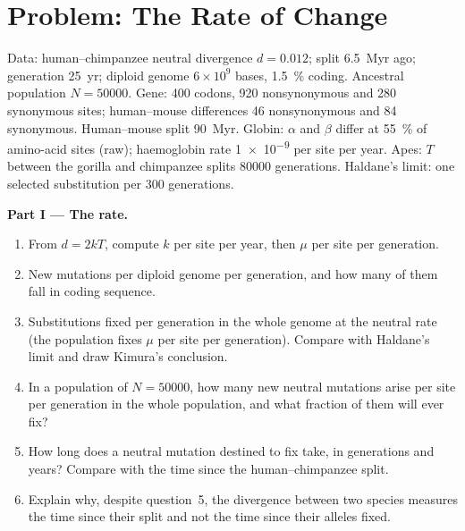 \section{Problem: The Rate of Change}

\begin{problem}
\label{pb:b3:molecular-evolution:1}
Data: human--chimpanzee neutral divergence $d = 0.012$; split
\qty{6.5}{Myr} ago; generation \qty{25}{yr}; diploid genome $6\times
10^{9}$ bases, \qty{1.5}{\%} coding. Ancestral population $N =
\num{50000}$. Gene: 400 codons, 920 nonsynonymous and 280 synonymous
sites; human--mouse differences 46 nonsynonymous and 84 synonymous.
Human--mouse split \qty{90}{Myr}. Globin: $\alpha$ and $\beta$ differ at
\qty{55}{\%} of amino-acid sites (raw); haemoglobin rate \num{1e-9} per
site per year. Apes: $T$ between the gorilla and chimpanzee splits
\num{80000} generations. Haldane's limit: one selected substitution per
300 generations.

\medskip
\noindent\textbf{Part I --- The rate.}
\begin{enumerate}
  \item From $d = 2kT$, compute $k$ per site per year, then $\mu$ per
        site per generation.
  \item New mutations per diploid genome per generation, and how many of
        them fall in coding sequence.
  \item Substitutions fixed per generation in the whole genome at the
        neutral rate (the population fixes $\mu$ per site per
        generation). Compare with Haldane's limit and draw Kimura's
        conclusion.
  \item In a population of $N = \num{50000}$, how many new neutral
        mutations arise per site per generation in the whole population,
        and what fraction of them will ever fix?
  \item How long does a neutral mutation destined to fix take, in
        generations and years? Compare with the time since the
        human--chimpanzee split.
  \item Explain why, despite question~5, the divergence between two
        species measures the time since their split and not the time
        since their alleles fixed.
\end{enumerate}


\end{problem}
